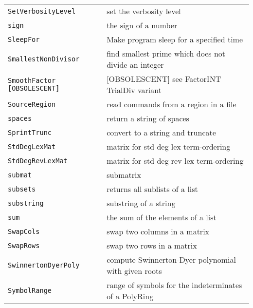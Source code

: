 \documentclass[a4paper]{mybook}
\begin{document}
\begin{center}
\begin{longtable}{ll}
{\verb~SetVerbosityLevel~} &
      set the verbosity level\\
   
{\verb~sign~} &
      the sign of a number\\
   
{\verb~SleepFor~} &
      Make program sleep for a specified time\\
   
{\verb~SmallestNonDivisor~} &
      find smallest prime which does not divide an integer\\
   
{\verb~SmoothFactor [OBSOLESCENT]~} &
      [OBSOLESCENT] see FactorINT TrialDiv variant\\
   
{\verb~SourceRegion~} &
      read commands from a region in a file\\
   
{\verb~spaces~} &
      return a string of spaces\\
   
{\verb~SprintTrunc~} &
      convert to a string and truncate\\
   
{\verb~StdDegLexMat~} &
      matrix for std deg lex term-ordering\\
   
{\verb~StdDegRevLexMat~} &
      matrix for std deg rev lex term-ordering\\
   
{\verb~submat~} &
      submatrix\\
   
{\verb~subsets~} &
      returns all sublists of a list\\
   
{\verb~substring~} &
      substring of a string\\
   
{\verb~sum~} &
      the sum of the elements of a list\\
   
{\verb~SwapCols~} &
      swap two columns in a matrix\\
   
{\verb~SwapRows~} &
      swap two rows in a matrix\\
   
{\verb~SwinnertonDyerPoly~} &
      compute Swinnerton-Dyer polynomial with given roots\\
   
{\verb~SymbolRange~} &
      range of symbols for the indeterminates of a PolyRing\\
   

\end{longtable}
\end{center}
\end{document}
